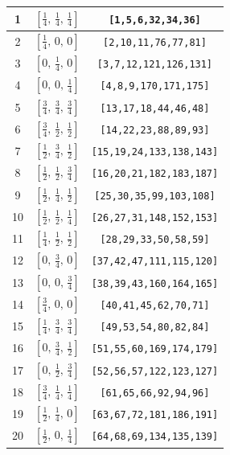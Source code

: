 \documentclass[fleqn,8pt]{jsarticle}
\begin{document}
\begin{longtable}{ccc}
1 & $\left[ \frac{1}{4},\, \frac{1}{4},\, \frac{1}{4} \right]$ & {\tt [1,5,6,32,34,36]} \\ \hline
2 & $\left[ \frac{1}{4},\, 0,\, 0 \right]$ & {\tt [2,10,11,76,77,81]} \\ \hline
3 & $\left[ 0,\, \frac{1}{4},\, 0 \right]$ & {\tt [3,7,12,121,126,131]} \\ \hline
4 & $\left[ 0,\, 0,\, \frac{1}{4} \right]$ & {\tt [4,8,9,170,171,175]} \\ \hline
5 & $\left[ \frac{3}{4},\, \frac{3}{4},\, \frac{3}{4} \right]$ & {\tt [13,17,18,44,46,48]} \\ \hline
6 & $\left[ \frac{3}{4},\, \frac{1}{2},\, \frac{1}{2} \right]$ & {\tt [14,22,23,88,89,93]} \\ \hline
7 & $\left[ \frac{1}{2},\, \frac{3}{4},\, \frac{1}{2} \right]$ & {\tt [15,19,24,133,138,143]} \\ \hline
8 & $\left[ \frac{1}{2},\, \frac{1}{2},\, \frac{3}{4} \right]$ & {\tt [16,20,21,182,183,187]} \\ \hline
9 & $\left[ \frac{1}{2},\, \frac{1}{4},\, \frac{1}{2} \right]$ & {\tt [25,30,35,99,103,108]} \\ \hline
10 & $\left[ \frac{1}{2},\, \frac{1}{2},\, \frac{1}{4} \right]$ & {\tt [26,27,31,148,152,153]} \\ \hline
11 & $\left[ \frac{1}{4},\, \frac{1}{2},\, \frac{1}{2} \right]$ & {\tt [28,29,33,50,58,59]} \\ \hline
12 & $\left[ 0,\, \frac{3}{4},\, 0 \right]$ & {\tt [37,42,47,111,115,120]} \\ \hline
13 & $\left[ 0,\, 0,\, \frac{3}{4} \right]$ & {\tt [38,39,43,160,164,165]} \\ \hline
14 & $\left[ \frac{3}{4},\, 0,\, 0 \right]$ & {\tt [40,41,45,62,70,71]} \\ \hline
15 & $\left[ \frac{1}{4},\, \frac{3}{4},\, \frac{3}{4} \right]$ & {\tt [49,53,54,80,82,84]} \\ \hline
16 & $\left[ 0,\, \frac{3}{4},\, \frac{1}{2} \right]$ & {\tt [51,55,60,169,174,179]} \\ \hline
17 & $\left[ 0,\, \frac{1}{2},\, \frac{3}{4} \right]$ & {\tt [52,56,57,122,123,127]} \\ \hline
18 & $\left[ \frac{3}{4},\, \frac{1}{4},\, \frac{1}{4} \right]$ & {\tt [61,65,66,92,94,96]} \\ \hline
19 & $\left[ \frac{1}{2},\, \frac{1}{4},\, 0 \right]$ & {\tt [63,67,72,181,186,191]} \\ \hline
20 & $\left[ \frac{1}{2},\, 0,\, \frac{1}{4} \right]$ & {\tt [64,68,69,134,135,139]} \\ \hline

\end{longtable}
\end{document}
